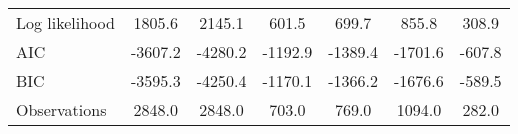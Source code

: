 \begin{table}[htbp]
\begin{tabular}{l*{6}{c}}
\hline
Log likelihood      &      1805.6         &      2145.1         &       601.5         &       699.7         &       855.8         &       308.9         \\
AIC                 &     -3607.2         &     -4280.2         &     -1192.9         &     -1389.4         &     -1701.6         &      -607.8         \\
BIC                 &     -3595.3         &     -4250.4         &     -1170.1         &     -1366.2         &     -1676.6         &      -589.5         \\
Observations        &      2848.0         &      2848.0         &       703.0         &       769.0         &      1094.0         &       282.0         \\
\hline\hline
\end{tabular}
\end{table}
